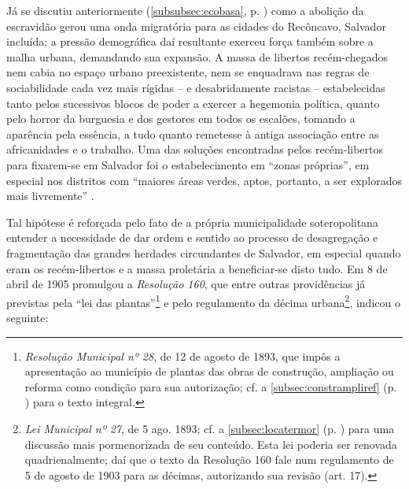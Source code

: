 Já se discutiu anteriormente (\autoref{subsubsec:ecobasa}, p. \pageref{subsubsec:ecobasa}) como a abolição da escravidão gerou uma onda migratória para as cidades do Recôncavo, Salvador incluída; a pressão demográfica daí resultante exerceu força também sobre a malha urbana, demandando sua expansão. A massa de libertos recém-chegados nem cabia no espaço urbano preexistente, nem se enquadrava nas regras de sociabilidade cada vez mais rígidas -- e desabridamente racistas -- estabelecidas tanto pelos sucessivos blocos de poder a exercer a hegemonia política, quanto pelo horror da burguesia e dos gestores em todos os escalões, tomando a aparência pela essência, a tudo quanto remetesse à antiga associação entre as africanidades e o trabalho. Uma das soluções encontradas pelos recém-libertos para fixarem-se em Salvador foi o estabelecimento em ``zonas próprias'', em especial nos distritos com ``maiores áreas verdes, aptos, portanto, a ser explorados mais livremente'' \cite{santos_habitacao_1990}. 

Tal hipótese é reforçada pelo fato de a própria municipalidade soteropolitana entender a necessidade de dar ordem e sentido ao processo de desagregação e fragmentação das grandes herdades circundantes de Salvador, em especial quando eram os recém-libertos e a massa proletária a beneficiar-se disto tudo. Em 8 de abril de 1905 promulgou a \textit{Resolução 160}, que entre outras providências já previstas pela ``lei das plantas''\footnote{\textit{Resolução Municipal nº 28}, de 12 de agosto de 1893, que impôs a apresentação ao município de plantas das obras de construção, ampliação ou reforma como condição para sua autorização; cf. a \autoref{subsec:constrampliref} (p. \pageref{subsec:constrampliref}) para o texto integral.} e pelo regulamento da décima urbana\footnote{\textit{Lei Municipal nº 27}, de 5 ago. 1893; cf. a \autoref{subsec:locatermor} (p. \pageref{subsec:locatermor}) para uma discussão mais pormenorizada de seu conteúdo. Esta lei poderia ser renovada quadrienalmente; daí que o texto da Resolução 160 fale num regulamento de 5 de agosto de 1903 para as décimas, autorizando sua revisão (art. 17).}, indicou o seguinte:

